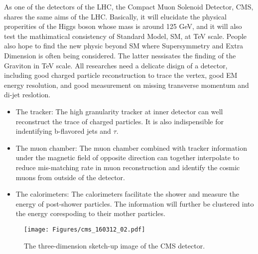 As one of the detectors of the LHC, the Compact Muon Solenoid Detector, CMS\citep{CMSDetector}, shares the same aims of the LHC.
Basically, it will elucidate the physical properities of the Higgs boson whose mass is around 125 GeV, and it will also test the mathimatical consistency of Standard Model, SM, at TeV scale.
People also hope to find the new physic beyond SM where Supersymmetry and Extra Dimension is often being considered. The latter nessisates the finding of the Graviton in TeV scale.
All researches need a delicate disign of a detector, including good charged particle reconstruction to trace the vertex, good EM energy resolution, and good measurement on missing transverse momentum and di-jet reslotion.
\begin{itemize}
\item The tracker: The high granularity tracker at inner detector can well reconstruct the trace of charged particles. It is also indispensible for indentifying b-flavored jets and $\tau$.  
\item The muon chamber: The muon chamber combined with tracker information under the magnetic field of opposite direction can together interpolate to reduce mis-matching rate in muon reconstruction and identify the cosmic muons from outside of the detector.
\item The calorimeters: The calorimeters facilitate the shower and measure the energy of post-shower particles. The information will further be clustered into the energy corespoding to their mother particles.
\end{itemize}

\begin{figure}[t]
  \begin{center}

    \texttt{[image: Figures/cms\_160312\_02.pdf]} 
    \end{center}
  \caption{The three-dimension sketch-up image of the CMS detector\citep{CMSImage}.}
\end{figure}

